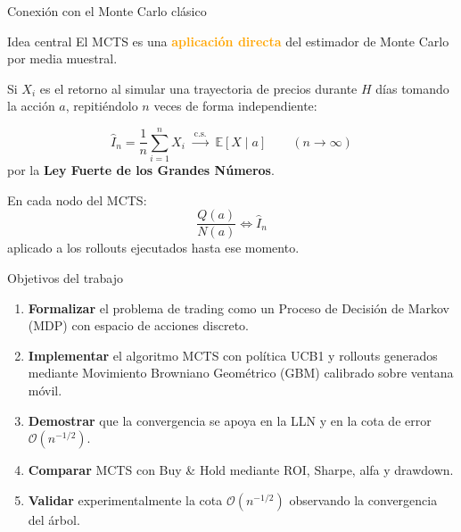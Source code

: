 \documentclass[aspectratio=169, 10pt]{beamer}
\begin{document}
\begin{frame}{Conexión con el Monte Carlo clásico}
  \begin{block}{Idea central}
    El MCTS es una \textbf{\textcolor{orange}{aplicación directa}} del estimador de Monte Carlo por media muestral.
  \end{block}

  \vspace{0.4cm}
  Si $X_i$ es el retorno al simular una trayectoria de precios durante $H$
  días tomando la acción $a$, repitiéndolo $n$ veces de forma independiente:

  \[
    \widehat{I}_n = \frac{1}{n}\sum_{i=1}^{n} X_i
    \;\xrightarrow{\ \text{c.s.}\ }\;
    \mathbb{E}[X \mid a]
    \qquad (n\to\infty) 
  \]
  por la \textbf{Ley Fuerte de los Grandes Números}.

  \vspace{0.4cm}
  \begin{alertblock}{}
  En cada nodo del MCTS:
  \begin{equation*}
  \frac{Q(a)}{N(a)}\Leftrightarrow \widehat{I}_n
  \end{equation*}
    aplicado a los rollouts ejecutados hasta ese momento.
  \end{alertblock}
\end{frame}

\begin{frame}{Objetivos del trabajo}
  \begin{enumerate}
    \item[\textbf{O1}] \textbf{Formalizar} el problema de trading como un
      Proceso de Decisión de Markov (MDP) con espacio de acciones discreto.
    \vspace{0.15cm}
    \item[\textbf{O2}] \textbf{Implementar} el algoritmo MCTS con política UCB1
      y rollouts generados mediante Movimiento Browniano Geométrico (GBM)
      calibrado sobre ventana móvil.
    \vspace{0.15cm}
    \item[\textbf{O3}] \textbf{Demostrar} que la convergencia se apoya en la
      LLN y en la cota de error $\mathcal{O}(n^{-1/2})$.
    \vspace{0.15cm}
    \item[\textbf{O4}] \textbf{Comparar} MCTS con Buy \& Hold mediante ROI,
      Sharpe, alfa y drawdown.
    \vspace{0.15cm}
    \item[\textbf{O5}] \textbf{Validar} experimentalmente la cota
      $\mathcal{O}(n^{-1/2})$ observando la convergencia del árbol.
  \end{enumerate}
\end{frame}
\end{document}
